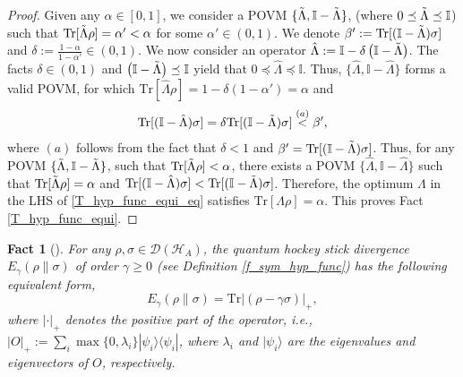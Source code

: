 \documentclass[onecolumn,ldraftcls, 11pt]{IEEEtran}
\newtheorem{fact}{Fact}
\newcommand{\tr}{\mathrm{Tr}}
\newcommand{\ketbra}[1]{|#1\rangle\langle#1|}
\newcommand*{\bbI}{\mathbb{I}}
\newcommand*{\cH}{\mathcal{H}}
\newcommand*{\cD}{\mathcal{D}}
\newcommand{\ket}[1]{|#1 \rangle}
\begin{document}
\begin{proof}
    Given any $\alpha \in [0,1]$, we consider a POVM $\{\Tilde{\Lambda},\bbI - \Tilde{\Lambda}\}$, (where $0 \preceq \Tilde{\Lambda} \preceq \bbI$) such that $\tr[\Tilde{\Lambda} \rho] = \alpha' < \alpha$ for some $\alpha' \in (0,1)$. We denote $\beta' := \tr[(\bbI - \Tilde{\Lambda})\sigma]$ and $\delta := \frac{1 -\alpha}{1-\alpha'} \in (0,1)$. We now consider an operator $\hat{\Lambda} := \bbI -\delta\left(\bbI -\Tilde{\Lambda}\right)$. The facts $\delta \in (0,1)$ and $\left(\bbI - \Tilde{\Lambda}\right) \preceq \bbI$ yield that $0\preceq \hat{\Lambda} \preceq \bbI$. Thus, $\{\hat{\Lambda},\bbI - \hat{\Lambda}\}$ forms a valid POVM, for which $\tr[\hat{\Lambda} \rho] = 1 - \delta(1-\alpha') = \alpha$ and
    \begin{align*}
        \tr[(\bbI - \hat{\Lambda})\sigma] = \delta \tr[(\bbI - \Tilde{\Lambda})\sigma]
      \overset{(a)}{<} \beta',
    \end{align*}
    where $(a)$ follows from the fact that $\delta < 1$ and $\beta' = \tr[(\bbI - \Tilde{\Lambda})\sigma]$. Thus, for any POVM $\{\Tilde{\Lambda},\bbI - \Tilde{\Lambda}\}$,  such that $\tr[\Tilde{\Lambda} \rho] < \alpha$, there exists a POVM $\{\hat{\Lambda},\bbI - \hat{\Lambda}\}$ such that $\tr[\Tilde{\Lambda} \rho] = \alpha$ and $\tr[(\bbI - \hat{\Lambda})\sigma] < \tr[(\bbI - \Tilde{\Lambda})\sigma]$. Therefore, the optimum $\Lambda$ in the LHS of \eqref{T_hyp_func_equi_eq} satisfies $\tr[{\Lambda} \rho] = \alpha$. This proves Fact \ref{T_hyp_func_equi}.
\end{proof}


\begin{fact}[\cite{SW12}]\label{Fact_hockey_equiv_form}
    For any $\rho,\sigma \in \cD(\cH_A)$, the quantum hockey stick divergence $E_{\gamma}(\rho\|\sigma)$ of order $\gamma \geq 0$ (see Definition \ref{f_sym_hyp_func}) has the following equivalent form,
    \begin{equation}
        E_{\gamma}(\rho\|\sigma) = \tr|(\rho - \gamma\sigma)|_{+},\label{Fact_hockey_equiv_form_eq}
    \end{equation}
    where $|\cdot|_{+}$ denotes the positive part of the operator, i.e., $|O|_{+} := \sum_{i} \max\{0,\lambda_i\}\ketbra{\psi_i}$, where $\lambda_i$ and $\ket{\psi_i}$ are the eigenvalues and eigenvectors of $O$, respectively.
\end{fact}
\end{document}
